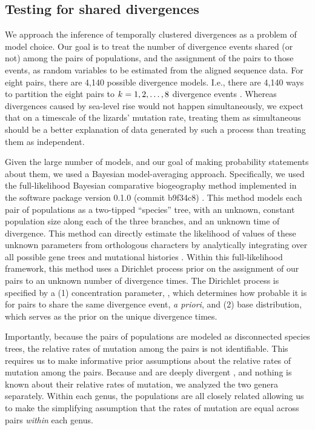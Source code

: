 \subsection{Testing for shared divergences}
We approach the inference of temporally clustered divergences as a problem of
model choice.
Our goal is to treat the number of divergence events shared (or not) among the
pairs of populations, and the assignment of the pairs to those events, as
random variables to be estimated from the aligned sequence data.
For eight pairs, there are 4,140 possible divergence models.
I.e., there are 4,140 ways to partition the eight pairs to $k_{} = 1, 2,
\ldots, 8$ divergence events \citep{Bell1934,Oaks2014dpp,Oaks2018ecoevolity}.
Whereas divergences caused by sea-level rise would not happen simultaneously,
we expect that on a timescale of the lizards' mutation rate, treating them as
simultaneous should be a better explanation of data generated by such a
process than treating them as independent.

Given the large number of models, and our goal of making probability statements
about them, we used a Bayesian model-averaging approach.
Specifically, we used the full-likelihood Bayesian comparative biogeography
method implemented in the software package \ecoevolity version 0.1.0 (commit
b9f34c8) \citep{Oaks2018ecoevolity}.
This method models each pair of populations as a two-tipped ``species'' tree,
with an unknown, constant population size along each of the three branches, and
an unknown time of divergence.
This method can directly estimate the likelihood of values of these unknown
parameters from orthologous  characters by analytically integrating
over all possible gene trees and mutational histories \citep{Bryant2012,
    Oaks2018ecoevolity}.
Within this full-likelihood framework, this method uses a Dirichlet process
prior on the assignment of our pairs to an unknown number of divergence times.
The Dirichlet process is specified by a
(1) concentration parameter, \concentration, which determines how probable it
is for pairs to share the same divergence event, \emph{a priori}, and
(2) base distribution, which serves as the prior on the unique divergence
times.

Importantly, because the pairs of populations are modeled as disconnected
species trees, the relative rates of mutation among the pairs is not
identifiable.
This requires us to make informative prior assumptions about the relative rates
of mutation among the pairs.
Because  and  are deeply divergent
\citep[$>$ 80 mya;][]{Gamble2011},
and nothing is known about their relative rates of mutation, we analyzed the
two genera separately.
Within each genus, the populations are all closely related \citep{Welton2010,
    Welton2010zootaxa, Siler2010, Siler2012, Siler2014kikuchii} allowing us to
make the simplifying assumption that the rates of mutation are equal across
pairs \emph{within} each genus.

